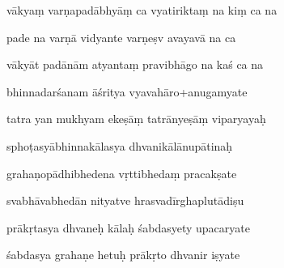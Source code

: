 \documentclass[article,12pt,a4paper]{memoir}%
\newcounter{parCount}
\begin{document}
	  
	  \pstart \leavevmode%
	vākyaṃ varṇapadābhyāṃ ca vyatiriktaṃ na kiṃ ca na 
	{}
	\pend%
      

	  
	  \pstart {} pade na varṇā vidyante varṇeṣv avayavā na ca 
	{}
	\pend%
      

	  
	  \pstart \leavevmode%
	vākyāt padānām atyantaṃ pravibhāgo na kaś ca na 
	{}
	\pend%
      

	  
	  \pstart {} bhinnadarśanam āśritya vyavahāro+anugamyate 
	{}
	\pend%
      

	  
	  \pstart \leavevmode%
	tatra yan mukhyam ekeṣāṃ tatrānyeṣāṃ viparyayaḥ 
	{}
	\pend%
      

	  
	  \pstart {} sphoṭasyābhinnakālasya dhvanikālānupātinaḥ 
	{}
	\pend%
      

	  
	  \pstart \leavevmode%
	grahaṇopādhibhedena vṛttibhedaṃ pracakṣate 
	{}
	\pend%
      

	  
	  \pstart {} svabhāvabhedān nityatve hrasvadīrghaplutādiṣu 
	{}
	\pend%
      

	  
	  \pstart \leavevmode%
	prākṛtasya dhvaneḥ kālaḥ śabdasyety upacaryate 
	{}
	\pend%
      

	  
	  \pstart {} śabdasya grahaṇe hetuḥ prākṛto dhvanir iṣyate 
	{}
	\pend%
      
\end{document}
